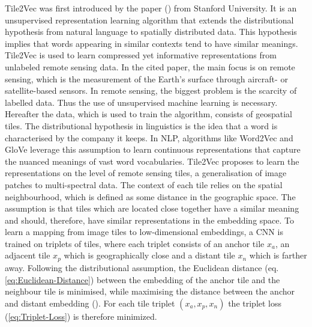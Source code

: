 Tile2Vec was first introduced by the paper (\cite{jean_tile2vec_2018}) from Stanford University. It is an unsupervised representation learning algorithm that extends the distributional hypothesis from natural language to spatially distributed data. This hypothesis implies that words appearing in similar contexts tend to have similar meanings. Tile2Vec is used to learn compressed yet informative representations from unlabeled remote sensing data.
\newline
\newline
In the cited paper, the main focus is on remote sensing, which is the measurement of the Earth's surface through aircraft- or satellite-based sensors. In remote sensing, the biggest problem is the scarcity of labelled data. Thus the use of unsupervised machine learning is necessary. Hereafter the data, which is used to train the algorithm, consists of geospatial tiles.
\newline
\newline
The distributional hypothesis in linguistics is the idea that \flqq a word is characterised by the company it keeps\frqq. In \gls{NLP}, algorithms like Word2Vec and GloVe leverage this assumption to learn continuous representations that capture the nuanced meanings of vast word vocabularies.
\newline
\newline
Tile2Vec proposes to learn the representations on the level of remote sensing tiles, a generalisation of image patches to multi-spectral data. The context of each tile relies on the spatial neighbourhood, which is defined as some distance in the geographic space. The assumption is that tiles which are located close together have a similar meaning and should, therefore, have similar representations in the embedding space.
\newline
\newline
To learn a mapping from image tiles to low-dimensional embeddings, a \gls{CNN} is trained on triplets of tiles, where each triplet consists of an anchor tile $x_a$, an adjacent tile $x_p$ which is geographically close and a distant tile $x_n$ which is farther away. Following the distributional assumption, the Euclidean distance (eq. \ref{eq:Euclidean-Distance}) between the embedding of the anchor tile and the neighbour tile is minimised, while maximising the distance between the anchor and distant embedding (). For each tile triplet $(x_a, x_p, x_n)$ the triplet loss (\ref{eq:Triplet-Loss}) is therefore minimized.
\newline
